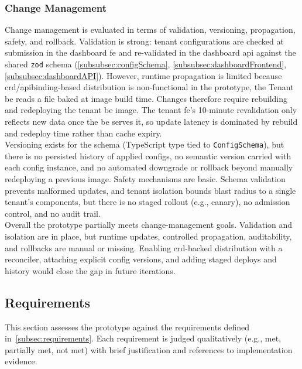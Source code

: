 \documentclass[11pt, a4paper, oneside, listof=totoc]{scrartcl}
\begin{document}
            \subsubsection{Change Management}\label{subsubsec:evalChangeManagement}
                Change management is evaluated in terms of validation, versioning, propagation,
                safety, and rollback.
                Validation is strong: tenant configurations are checked at submission in the
                dashboard \gls{fe} and re-validated in the dashboard \gls{api} against the shared
                \texttt{zod} schema (\autoref{subsubsec:configSchema},
                \autoref{subsubsec:dashboardFrontend}, \autoref{subsubsec:dashboardAPI}).
                However, runtime propagation is limited because \gls{crd}/\gls{apibinding}-based
                distribution is non-functional in the prototype, the Tenant \gls{be} reads a file
                baked at image build time.
                Changes therefore require rebuilding and redeploying the tenant \gls{be} image.
                The tenant \gls{fe}'s 10-minute revalidation only reflects new data once the
                \gls{be} serves it, so update latency is dominated by rebuild and redeploy time
                rather than cache expiry.\\
                Versioning exists for the schema (TypeScript type tied to \texttt{ConfigSchema}),
                but there is no persisted history of applied configs, no semantic version carried
                with each config instance, and no automated downgrade or rollback beyond manually
                redeploying a previous image.
                Safety mechanisms are basic.
                Schema validation prevents malformed updates, and tenant isolation bounds blast
                radius to a single tenant's components, but there is no staged rollout
                (e.g., canary), no admission control, and no audit trail.\\
                Overall the prototype partially meets change-management goals.
                Validation and isolation are in place, but runtime updates, controlled propagation,
                auditability, and rollbacks are manual or missing.
                Enabling \gls{crd}-backed distribution with a reconciler, attaching explicit config
                versions, and adding staged deploys and history would close the gap in future
                iterations.

        \subsection{Requirements}\label{subsec:evalRequirements}
            This section assesses the prototype against the requirements defined
            in~\autoref{subsec:requirements}.
            Each requirement is judged qualitatively (e.g., met, partially met, not met) with brief
            justification and references to implementation evidence.
\end{document}
